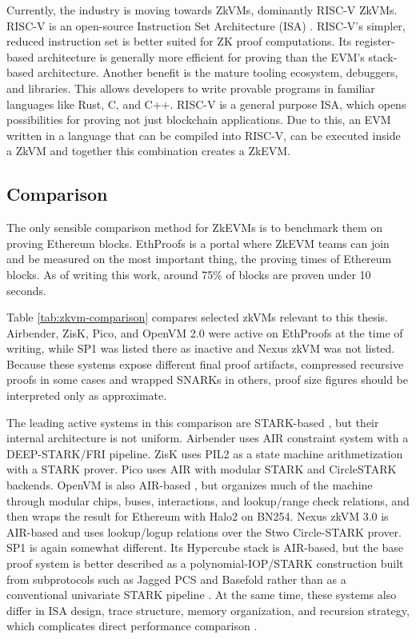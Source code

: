 Currently, the industry is moving towards ZkVMs, dominantly RISC-V ZkVMs. RISC-V is
an open-source Instruction Set Architecture (ISA) \cite{SoKZkVMs, RISCV, RISCVUnprivileged}. RISC-V's
simpler, reduced instruction set is better suited for ZK proof computations.
Its register-based architecture is generally more efficient for proving than
the EVM's stack-based architecture. Another benefit is the mature tooling
ecosystem, debuggers, and libraries.
This allows developers to write provable programs in familiar languages like
Rust, C, and C++. RISC-V is a general purpose ISA, which opens possibilities
for proving not just blockchain applications. Due to this, an EVM written in
a language that can be compiled into RISC-V, can be executed inside a ZkVM and
together this combination creates a ZkEVM.

\subsection{Comparison}

The only sensible comparison method for ZkEVMs is to benchmark them on proving
Ethereum blocks. EthProofs \cite{EthProofs} is a portal where ZkEVM teams can
join and be measured on the most important thing, the proving times of Ethereum
blocks. As of writing this work, around 75\% of blocks are proven under 10 seconds.

Table \ref{tab:zkvm-comparison} compares selected zkVMs relevant to this
thesis. Airbender, ZisK, Pico, and OpenVM 2.0 were active on EthProofs at the
time of writing, while SP1 was listed there as inactive and Nexus zkVM was not
listed. Because these systems expose different final proof artifacts,
compressed recursive proofs in some cases and wrapped SNARKs in others, proof
size figures should be interpreted only as approximate.

The leading active systems in this comparison are STARK-based
\cite{STARK}, but their internal architecture is not uniform.
Airbender uses AIR constraint system with a DEEP-STARK/FRI pipeline.
ZisK uses PIL2 as a state machine arithmetization with a STARK prover.
Pico uses AIR with modular STARK and CircleSTARK backends. OpenVM is
also AIR-based \cite{OpenvmDesignSpec}, but organizes much of the machine through modular chips, buses,
interactions, and lookup/range check relations, and then wraps the result for
Ethereum with Halo2 on BN254. Nexus zkVM 3.0 is AIR-based and uses lookup/logup
relations over the Stwo Circle-STARK prover. SP1 is
again somewhat different. Its Hypercube stack is AIR-based, but the base proof
system is better described as a polynomial-IOP/STARK construction built
from subprotocols such as Jagged PCS and Basefold rather than as a conventional
univariate STARK pipeline \cite{SP1Hypercube}. At the same time, these systems also differ in ISA
design, trace structure, memory organization, and recursion strategy, which
complicates direct performance comparison \cite{SoKZkVMs}.


